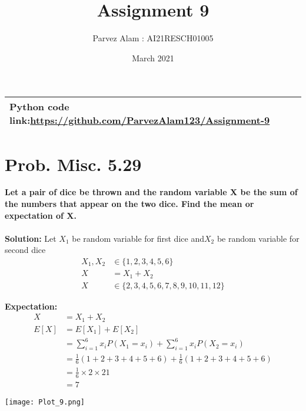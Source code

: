 \documentclass{article}
\title{Assignment 9}
\author{Parvez Alam : AI21RESCH01005 }
\date{March 2021}
\begin{document}
\maketitle
\begin{multicols}{2}
\begin{center}
    \begin{tabular}{|p{5cm}|}
    \hline
        Python code link:\url{https://github.com/ParvezAlam123/Assignment-9} \\
        \hline
    \end{tabular}
\end{center}


\section{Prob. Misc. 5.29}
\textbf{Let a pair of dice be thrown and the random variable X be the sum of the numbers that appear on the two dice. Find the mean or expectation of X.} \\ \\
\textbf{Solution:} 
Let \(X_1\) be random variable for first dice and\( X_2\) be random variable for second dice
\begin{align}
    X_1, X_2 &\in \{1,2,3,4,5,6\}  \nonumber \\
    X &= X_1+X_2 \nonumber  \nonumber \\
    X &\in \{2,3,4,5,6,7,8,9,10,11,12\} \nonumber 
\end{align}

\textbf{Expectation:} \\
\begin{align}
    X &=X_1+X_2 \nonumber \\
    E[X] &=E[X_1]+E[X_2] \nonumber \\
         &=\sum _{i=1}^6x_iP(X_1=x_i)+\sum _{i=1}^6x_iP(X_2=x_i) \nonumber \\
         &=\frac{1}{6}(1+2+3+4+5+6)+\frac{1}{6}(1+2+3+4+5+6) \nonumber \\
         &=\frac{1}{6}\times 2 \times 21 \nonumber \\
         &=7 \nonumber
\end{align}

\texttt{[image: Plot\_9.png]}



\end{multicols}
\end{document}
